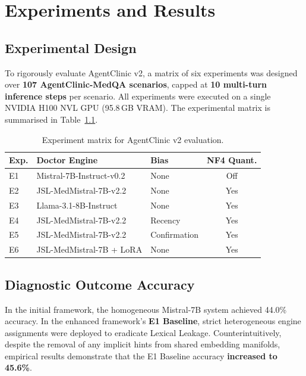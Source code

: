 \chapter{Experiments and Results}
\label{Chapter6}

\section{Experimental Design}

To rigorously evaluate AgentClinic v2, a matrix of six experiments was designed over \textbf{107 AgentClinic-MedQA scenarios}, capped at \textbf{10 multi-turn inference steps} per scenario. All experiments were executed on a single NVIDIA H100 NVL GPU (95.8\,GB VRAM). The experimental matrix is summarised in Table~\ref{tab:exp_matrix}.


\begin{table}[H]
\centering
\caption{Experiment matrix for AgentClinic v2 evaluation.}
\label{tab:exp_matrix}
\begin{tabular}{@{}lllc@{}}
\toprule
\textbf{Exp.} & \textbf{Doctor Engine} & \textbf{Bias} & \textbf{NF4 Quant.} \\
\midrule
E1 & Mistral-7B-Instruct-v0.2 & None         & Off \\
E2 & JSL-MedMistral-7B-v2.2   & None         & Yes \\
E3 & Llama-3.1-8B-Instruct    & None         & Yes \\
E4 & JSL-MedMistral-7B-v2.2   & Recency      & Yes \\
E5 & JSL-MedMistral-7B-v2.2   & Confirmation & Yes \\
E6 & JSL-MedMistral-7B + LoRA  & None         & Yes \\
\bottomrule
\end{tabular}
\end{table}

\section{Diagnostic Outcome Accuracy}

In the initial framework, the homogeneous Mistral-7B system achieved 44.0\% accuracy. In the enhanced framework's \textbf{E1 Baseline}, strict heterogeneous engine assignments were deployed to eradicate Lexical Leakage. Counterintuitively, despite the removal of any implicit hints from shared embedding manifolds, empirical results demonstrate that the E1 Baseline accuracy \textbf{increased to 45.6\%}.

